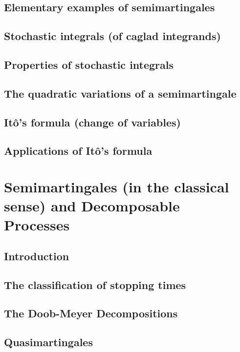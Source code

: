 \documentclass[openany,oneside]{book}
\theoremstyle{definition}
\theoremstyle{remark}
\begin{document}
\section{Elementary examples of semimartingales}

\section{Stochastic integrals (of caglad integrands)}

\section{Properties of stochastic integrals}

\section{The quadratic variations of a semimartingale}

\section{It\^o's formula (change of variables)}

\section{Applications of It\^o's formula}


\chapter{Semimartingales (in the classical sense) and Decomposable Processes}

\section{Introduction}

\section{The classification of stopping times}

\section{The Doob-Meyer Decompositions}

\section{Quasimartingales}
\end{document}
